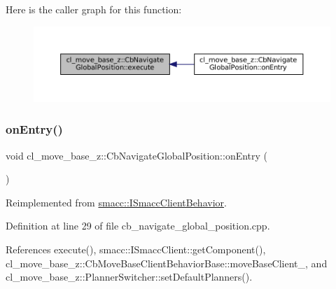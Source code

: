 Here is the caller graph for this function\+:
\nopagebreak
\begin{figure}[H]
\begin{center}
\leavevmode
\includegraphics[width=350pt]{classcl__move__base__z_1_1CbNavigateGlobalPosition_a0b8525ea9e4388b27cb1f9b1e06a3b63_icgraph}
\end{center}
\end{figure}
\mbox{\label{classcl__move__base__z_1_1CbNavigateGlobalPosition_a66d8b0555ef2945bc108dcd5171be292}} 
\subsubsection{\texorpdfstring{on\+Entry()}{onEntry()}}
{\footnotesize\ttfamily void cl\+\_\+move\+\_\+base\+\_\+z\+::\+Cb\+Navigate\+Global\+Position\+::on\+Entry (\begin{DoxyParamCaption}{ }\end{DoxyParamCaption})\hspace{0.3cm}{\ttfamily [virtual]}}



Reimplemented from \hyperlink{classsmacc_1_1ISmaccClientBehavior_a3ec24a839087c550e1d62a81e48cf530}{smacc\+::\+I\+Smacc\+Client\+Behavior}.



Definition at line 29 of file cb\+\_\+navigate\+\_\+global\+\_\+position.\+cpp.



References execute(), smacc\+::\+I\+Smacc\+Client\+::get\+Component(), cl\+\_\+move\+\_\+base\+\_\+z\+::\+Cb\+Move\+Base\+Client\+Behavior\+Base\+::move\+Base\+Client\+\_\+, and cl\+\_\+move\+\_\+base\+\_\+z\+::\+Planner\+Switcher\+::set\+Default\+Planners().


